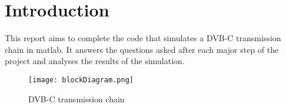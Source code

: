 \setcounter{secnumdepth}{-1}

\chapter{Introduction}

This report aims to complete the code that simulates a DVB-C transmission chain in matlab. It answers the questions asked after each major step of the project and analyses the results of the simulation.

\vspace{2cm}

\begin{figure}[H]
    \centering
    \texttt{[image: blockDiagram.png]}
    \caption{DVB-C transmission chain}
    \label{fig:blockDiagram}
\end{figure}
